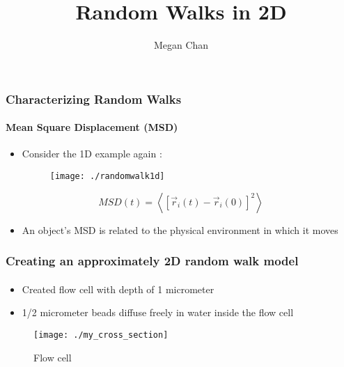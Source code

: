 \documentclass[mathserif]{beamer}
\title[]{Random Walks in 2D}
\author[]{Megan Chan}
\institute{The University of Texas at Austin}
\begin{document}
\frame{\titlepage}

  \begin{frame}
      \frametitle{Characterizing Random Walks}
      \framesubtitle{Mean Square Displacement (MSD)}
      \begin{itemize}
      \item Consider the 1D example again \cite{drunk}:
      	\begin{figure}
		\centering
		\texttt{[image: ./randomwalk1d]}
		\label{fig:randomwalk1d}
		\end{figure}
	  \end{itemize}
	  \begin{equation}
	  MSD(t) = \left<\left[ \vec{r}_i(t)- \vec{r}_i(0) \right]^2 \right>
	  \end{equation}
	  \begin{itemize}
      \item An object's MSD is related to the physical environment in which it moves \cite{ID}
      \end{itemize}
  \end{frame}
  
  \begin{frame}
    \frametitle{Creating an approximately 2D random walk model}
    \framesubtitle{}
    \begin{itemize}
    \item Created flow cell with depth of 1 micrometer
    \item 1/2 micrometer beads diffuse freely in water inside the flow cell
    \end{itemize}
    \begin{figure}
		\centering
		\texttt{[image: ./my\_cross\_section]}
		\caption{Flow cell}
		\label{fig:my_cross_section}
	\end{figure}
  \end{frame}
  
\end{document}
